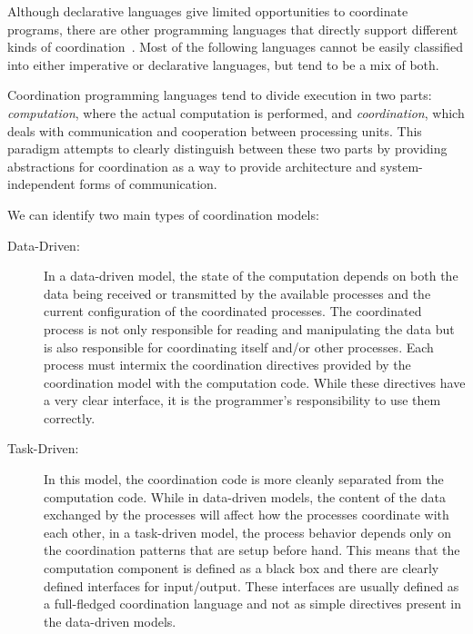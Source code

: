 Although declarative languages give limited opportunities to coordinate
programs, there are other programming languages that directly support different
kinds of coordination~\cite{Papadopoulos98coordinationmodels}. Most of the
following languages cannot be easily classified into either imperative or
declarative languages, but tend to be a mix of both.

Coordination programming languages tend to divide execution in two parts:
\emph{computation}, where the actual computation is performed, and
\emph{coordination}, which deals with communication and cooperation between
processing units. This paradigm attempts to clearly distinguish between these
two parts by providing abstractions for coordination as a way to provide
architecture and system-independent forms of communication.

We can identify two main types of coordination models:

\begin{description}
   \item[Data-Driven:]
   
   In a data-driven model, the state of the computation depends on both the data
   being received or transmitted by the available processes and the current configuration
   of the coordinated processes. The coordinated process is not only responsible
   for reading and manipulating the data but is also responsible for
   coordinating itself and/or other processes. Each process must intermix the
   coordination directives provided by the coordination model with the
   computation code. While these directives have a very clear interface, it is
   the programmer's responsibility to use them correctly.

   \item[Task-Driven:]
   
   In this model, the coordination code is more cleanly separated from the
   computation code. While in data-driven models, the content of the data
   exchanged by the processes will affect how the processes coordinate with each
   other, in a task-driven model, the process behavior depends only on the
   coordination patterns that are setup before hand. This means that the
   computation component is defined as a black box and there are clearly defined
   interfaces for input/output. These interfaces are usually defined as a
   full-fledged coordination language and not as simple directives present in
   the data-driven models.  \end{description}

